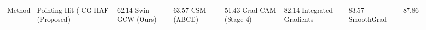 \begin{tabular}{llllll}
\toprule
Method & Pointing Hit (%
\midrule
CG-HAF (Proposed) & 62.14%
Swin-GCW (Ours) & 63.57%
CSM (ABCD) & 51.43%
Grad-CAM (Stage 4) & 82.14%
Integrated Gradients & 83.57%
SmoothGrad & 87.86%
\bottomrule
\end{tabular}
